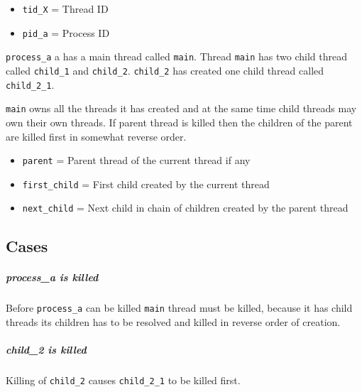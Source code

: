 \begin{itemize}
  \item \verb+tid_X+ = Thread ID
  \item \verb+pid_a+ = Process ID
\end{itemize}

\verb+process_a+ a has a main thread called \verb+main+. Thread
\verb+main+ has two child thread called \verb+child_1+ and \verb+child_2+.
\verb+child_2+ has created one child thread called \verb+child_2_1+.

\verb+main+ owns all the threads it has created and at the same time child
threads may own their own threads. If parent thread is killed then the
children of the parent are killed first in somewhat reverse order.

\begin{itemize}
  \item \verb+parent+ = Parent thread of the current thread if any
  \item \verb+first_child+ = First child created by the current thread
  \item \verb+next_child+ = Next child in chain of children created by the
        parent thread
\end{itemize}

\subsection{Cases}
\subparagraph*{process\_a is killed}

Before \verb+process_a+ can be killed \verb+main+ thread must be killed,
because it has child threads its children has to be resolved and killed in
reverse order of creation.

\subparagraph*{child\_2 is killed}

Killing of \verb+child_2+ causes \verb+child_2_1+ to be killed first.
